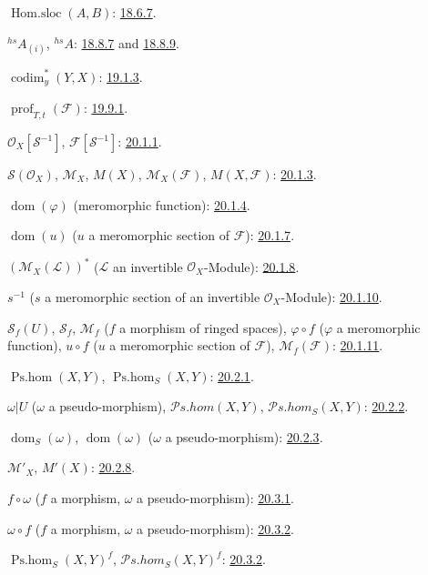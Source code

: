 $\operatorname{Hom.sloc}(A,B)$: {\hyperref[IV.18.6.7]{18.6.7}}.

${}^{hs}A_{(i)}$, ${}^{hs}A$: {\hyperref[IV.18.8.7]{18.8.7}} and
{\hyperref[IV.18.8.9]{18.8.9}}.

$\operatorname{codim}^{*}_{y}(Y,X)$: {\hyperref[IV.19.1.3]{19.1.3}}.

$\operatorname{prof}_{T,t}(\mathcal F)$: {\hyperref[IV.19.9.1]{19.9.1}}.

$\mathcal O_X[\mathcal S^{-1}]$, $\mathcal F[\mathcal S^{-1}]$:
{\hyperref[IV.20]{20.1.1}}.

$\mathcal S(\mathcal O_X)$, $\mathcal M_X$, $M(X)$,
$\mathcal M_X(\mathcal F)$, $M(X,\mathcal F)$:
{\hyperref[IV.20]{20.1.3}}.

$\operatorname{dom}(\varphi)$ (meromorphic function):
{\hyperref[IV.20]{20.1.4}}.

$\operatorname{dom}(u)$ ($u$ a meromorphic section of $\mathcal F$):
{\hyperref[IV.20]{20.1.7}}.

$(\mathcal M_X(\mathcal L))^{*}$
($\mathcal L$ an invertible $\mathcal O_X$-Module):
{\hyperref[IV.20]{20.1.8}}.

$s^{-1}$ ($s$ a meromorphic section of an invertible
$\mathcal O_X$-Module): {\hyperref[IV.20.1.10]{20.1.10}}.

$\mathcal S_f(U)$, $\mathcal S_f$, $\mathcal M_f$
($f$ a morphism of ringed spaces), $\varphi\circ f$ ($\varphi$ a
meromorphic function), $u\circ f$ ($u$ a meromorphic section of
$\mathcal F$), $\mathcal M_f(\mathcal F)$: {\hyperref[IV.20]{20.1.11}}.

$\operatorname{Ps.hom}(X,Y)$, $\operatorname{Ps.hom}_S(X,Y)$:
{\hyperref[IV.20]{20.2.1}}.

$\omega|U$ ($\omega$ a pseudo-morphism),
$\mathcal P\!s.\mathit{hom}(X,Y)$,
$\mathcal P\!s.\mathit{hom}_S(X,Y)$:
{\hyperref[IV.20]{20.2.2}}.

$\operatorname{dom}_S(\omega)$, $\operatorname{dom}(\omega)$
($\omega$ a pseudo-morphism): {\hyperref[IV.20]{20.2.3}}.

$\mathcal M'_X$, $M'(X)$: {\hyperref[IV.20]{20.2.8}}.

$f\circ\omega$ ($f$ a morphism, $\omega$ a pseudo-morphism):
{\hyperref[IV.20]{20.3.1}}.

$\omega\circ f$ ($f$ a morphism, $\omega$ a pseudo-morphism):
{\hyperref[IV.20]{20.3.2}}.

$\operatorname{Ps.hom}_S(X,Y)^f$,
$\mathcal P\!s.\mathit{hom}_S(X,Y)^f$: {\hyperref[IV.20]{20.3.2}}.

